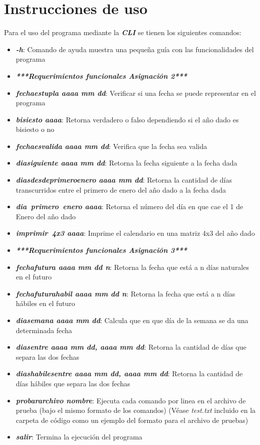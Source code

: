 \documentclass[10pt,journal,compsoc]{IEEEtran}
\begin{document}
\section{Instrucciones de uso}
\par Para el uso del programa mediante la \textbf{\textit{CLI}} se tienen los siguientes comandos:
\begin{itemize}
	\item \textbf{\textit{-h}}: Comando de ayuda muestra una pequeña guía con las funcionalidades del programa
	\item \textbf{\textit{***Requerimientos funcionales Asignación 2***}}
	\item \textbf{\textit{fecha\textunderscore es\textunderscore tupla aaaa mm dd}}: Verificar si una fecha se puede representar en el programa
	\item \textbf{\textit{bisiesto aaaa}}: Retorna verdadero o falso dependiendo si el año dado es bisiesto o no
	\item \textbf{\textit{fecha\textunderscore es\textunderscore valida aaaa mm dd}}: Verifica que la fecha sea valida
	\item \textbf{\textit{dia\textunderscore siguiente aaaa mm dd}}: Retorna la fecha siguiente a la fecha dada
	\item \textbf{\textit{dias\textunderscore desde\textunderscore primero\textunderscore enero aaaa mm dd}}: Retorna la cantidad de días transcurridos entre el primero de enero del año dado a la fecha dada
	\item \textbf{\textit{dia\textunderscore~primero\textunderscore~enero aaaa}}: Retorna el número del día en que cae el 1 de Enero del año dado
	\item \textbf{\textit{imprimir\textunderscore~4x3 aaaa}}: Imprime el calendario en una matriz 4x3 del año dado
	\item \textbf{\textit{***Requerimientos funcionales Asignación 3***}}
	\item \textbf{\textit{fecha\textunderscore futura aaaa mm dd n}}:  Retorna la fecha que está a n días naturales en el futuro
	\item \textbf{\textit{fecha\textunderscore futura\textunderscore habil aaaa mm dd n}}:  Retorna la fecha que está a n días hábiles en el futuro
	\item \textbf{\textit{dia\textunderscore semana aaaa mm dd}}:  Calcula que en que día de la semana se da una determinada fecha
	\item \textbf{\textit{dias\textunderscore entre aaaa mm dd, aaaa mm dd}}:  Retorna la cantidad de días que separa las dos fechas
	\item \textbf{\textit{dias\textunderscore habiles\textunderscore entre aaaa mm dd, aaaa mm dd}}:  Retorna la cantidad de días hábiles que separa las dos fechas
	\item \textbf{\textit{probar\textunderscore archivo nombre}}: Ejecuta cada comando por linea en el archivo de prueba (bajo el mismo formato de los comandos) (Véase \textit{test.txt} incluido en la carpeta de código como un ejemplo del formato para el archivo de pruebas)
	\item \textbf{\textit{salir}}: Termina la ejecución del programa
\end{itemize}
\end{document}
